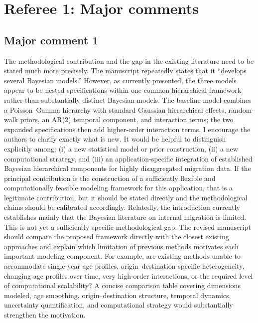 \documentclass[11pt,a4paper]{article}
\newcommand{\refcomment}[2]{\par\Needspace{5\baselineskip}\subsection*{#1}#2\par}
\begin{document}
\section*{Referee 1: Major comments}
\refcomment{Major comment 1}{
The methodological contribution and the gap in the existing literature need to be stated much more precisely. The manuscript repeatedly states that it ``develops several Bayesian models.'' However, as currently presented, the three models appear to be nested specifications within one common hierarchical framework rather than substantially distinct Bayesian models. The baseline model combines a Poisson--Gamma hierarchy with standard Gaussian hierarchical effects, random-walk priors, an AR(2) temporal component, and interaction terms; the two expanded specifications then add higher-order interaction terms. I encourage the authors to clarify exactly what is new. It would be helpful to distinguish explicitly among: (i) a new statistical model or prior construction, (ii) a new computational strategy, and (iii) an application-specific integration of established Bayesian hierarchical components for highly disaggregated migration data. If the principal contribution is the construction of a sufficiently flexible and computationally feasible modeling framework for this application, that is a legitimate contribution, but it should be stated directly and the methodological claims should be calibrated accordingly. Relatedly, the introduction currently establishes mainly that the Bayesian literature on internal migration is limited. This is not yet a sufficiently specific methodological gap. The revised manuscript should compare the proposed framework directly with the closest existing approaches and explain which limitation of previous methods motivates each important modeling component. For example, are existing methods unable to accommodate single-year age profiles, origin--destination-specific heterogeneity, changing age profiles over time, very high-order interactions, or the required level of computational scalability? A concise comparison table covering dimensions modeled, age smoothing, origin--destination structure, temporal dynamics, uncertainty quantification, and computational strategy would substantially strengthen the motivation.
}
\end{document}
